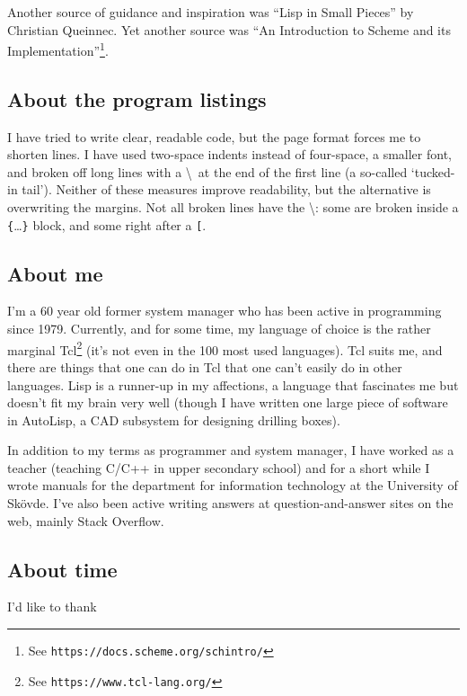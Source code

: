 \documentclass[twoside]{report}
\begin{document}
Another source of guidance and inspiration was ``Lisp in Small Pieces'' by
Christian Queinnec. Yet another source was ``An Introduction to Scheme and its
Implementation''\footnote{See \texttt{https://docs.scheme.org/schintro/}}.

\subsection{About the program listings}
\label{about-the-program-listings}

I have tried to write clear, readable code, but the page format forces me to
shorten lines. I have used two-space indents instead of four-space, a smaller
font, and broken off long lines with a \textbackslash\  at the end of the first
line (a so-called `tucked-in tail'). Neither of these measures improve
readability, but the alternative is overwriting the margins. Not all broken
lines have the \textbackslash: some are broken inside a
\texttt{\{}\ldots\texttt{\}} block, and some right after a \texttt{^^5b}.

\subsection{About me}
\label{about-me}

I'm a 60 year old former system manager who has been active in programming
since 1979. Currently, and for some time, my language of choice is the
rather marginal Tcl\footnote{See \texttt{https://www.tcl-lang.org/}} (it's not
even in the 100 most used languages). Tcl suits me, and there are things that
one can do in Tcl that one can't easily do in other languages. Lisp is a
runner-up in my affections, a language that fascinates me but doesn't fit my
brain very well (though I have written one large piece of software in AutoLisp,
a CAD subsystem for designing drilling boxes).

In addition to my terms as programmer and system manager, I have worked as a
teacher (teaching C/C++ in upper secondary school) and for a short while I
wrote manuals for the department for information technology at
the University of Skövde. I've also been active writing answers at
question-and-answer sites on the web, mainly Stack Overflow.

\subsection{About time}
\label{about-time}

I'd like to thank
\end{document}
